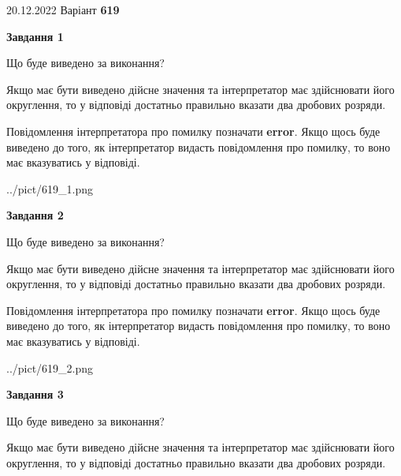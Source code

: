 \documentclass[12pt, ukrainian]{article}
\begin{document}
{20.12.2022 Варіант \No \textbf { 619 }\par}
{
\begin {Large}

{\begin {center}\textbf{Завдання 1}\end {center}}\par
Що буде виведено за виконання? \par

Якщо має бути виведено дійсне значення та інтерпретатор має здійснювати його округлення, 
то у відповіді достатньо правильно вказати два дробових розряди.

Повідомлення інтерпретатора про помилку позначати \textbf{error}.
Якщо щось буде виведено до того, як інтерпретатор видасть повідомлення про помилку, 
то воно має вказуватись у відповіді. \par

\begin{center}
	{../pict/619_1.png}
\end{center}
\newpage

{\begin {center}\textbf{Завдання 2}\end {center}}\par
Що буде виведено за виконання? \par

Якщо має бути виведено дійсне значення та інтерпретатор має здійснювати його округлення, 
то у відповіді достатньо правильно вказати два дробових розряди.

Повідомлення інтерпретатора про помилку позначати \textbf{error}.
Якщо щось буде виведено до того, як інтерпретатор видасть повідомлення про помилку, 
то воно має вказуватись у відповіді. \par

\begin{center}
	{../pict/619_2.png}
\end{center}
\newpage

{\begin {center}\textbf{Завдання 3}\end {center}}\par
Що буде виведено за виконання? \par

Якщо має бути виведено дійсне значення та інтерпретатор має здійснювати його округлення, 
то у відповіді достатньо правильно вказати два дробових розряди.


\end{Large}}
\end{document}
